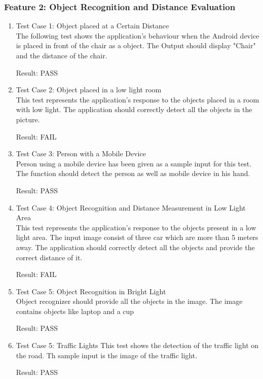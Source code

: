\documentclass[MScCS]{uccthesis}
\begin{document}
\subsubsection{Feature 2: Object Recognition and Distance Evaluation}
\begin{enumerate}
    \item Test Case 1: Object placed at a Certain Distance
    \\The following test shows the application's behaviour when the Android device is placed in front of the chair as a object. The Output should display "Chair" and the distance of the chair.
    
    Result: PASS
     \item Test Case 2: Object placed in a low light room
    \\This test represents the application's response to the objects placed in a room with low light. The application should correctly detect all the objects in the picture. 
   
    Result: FAIL
    \item Test Case 3: Person with a Mobile Device
    \\Person using a mobile device has been given as a sample input for this test. The function should detect the person as well as mobile device in his hand.
   
    Result: PASS

    \item Test Case 4: Object Recognition and Distance Measurement in Low Light Area
    \\This test represents the application's response to the objects present in a low light area. The input image consist of three car which are more than 5 meters away. The application should correctly detect all the objects and provide the correct distance of it. 

   Result: FAIL

   \item Test Case 5: Object Recognition in Bright Light
    \\Object recognizer should provide all the objects in the image. The image contains objects like laptop and a cup

   Result: PASS

   \item Test Case 5: Traffic Lights
    This test shows the detection of the traffic light on the road. Th sample input is the image of the traffic light.

   Result: PASS

   \end{enumerate}
\end{document}
